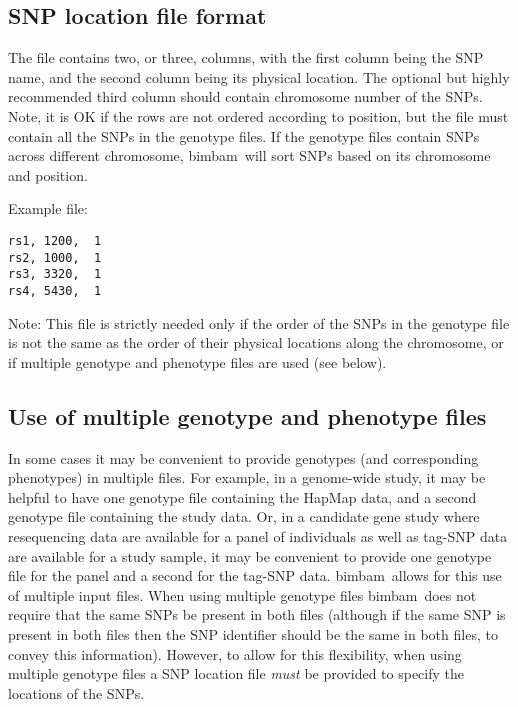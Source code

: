 \documentclass[11pt,Palatino]{article}
\def\bimbam{{\sc bimbam}~}
\begin{document}
\subsection{SNP location file format}

The file contains two, or three, columns, with the first column being the SNP name, and the second column being its physical location.
The optional but highly recommended third column should contain chromosome number of the SNPs.
Note, it is OK if the rows are not ordered according to position, but the file must contain all the SNPs in the genotype files.
If the genotype files contain SNPs across different chromosome, \bimbam will sort SNPs based on its chromosome and position.

Example file:

\begin{verbatim}
rs1, 1200,  1
rs2, 1000,  1
rs3, 3320,  1
rs4, 5430,  1
\end{verbatim}
Note: This file is strictly needed only if the order of the SNPs in the genotype file is not the same as the order of their physical locations along the chromosome, or if multiple genotype and phenotype files are used (see below).



\subsection{Use of multiple genotype and phenotype files}

In some cases it may be convenient to provide genotypes (and corresponding phenotypes) in multiple files. For example, in a genome-wide study, it may be helpful to have one genotype file containing the HapMap data, and a second genotype file containing the study data. Or, in a candidate gene study where resequencing data are available for a panel of individuals as well as tag-SNP data are available for a study sample, it may be convenient to provide one genotype file for the panel and a second for the tag-SNP data. \bimbam allows for this use of multiple input files. When using multiple genotype files \bimbam does not require that the same SNPs be present in both files (although if the same SNP is present in both files then the SNP identifier should be the same in both files, to convey this information). However, to allow for this flexibility, when using multiple genotype files a SNP location file {\it must} be provided to specify the locations of the SNPs.
\end{document}
